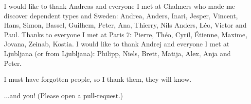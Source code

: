 I would like to thank Andreas and everyone I met at Chalmers who made me
discover dependent types and Sweden: Andrea, Anders, Inari, Jesper, Vincent,
Hans, Simon, Bassel, Guilhem, Peter, Ana, Thierry, Nils Anders, Léo, Victor
and Paul.
%
Thanks to everyone I met at Paris 7: Pierre, Théo, Cyril, Étienne, Maxime,
Jovana, Zeinab, Kostia.
%
I would like to thank Andrej and everyone I met at Ljubljana
(or from Ljubljana): Philipp, Niels, Brett, Matija, Alex, Anja and Peter.


I must have forgotten people, so I thank them, they will know.


...and you! (Please open a pull-request.)


